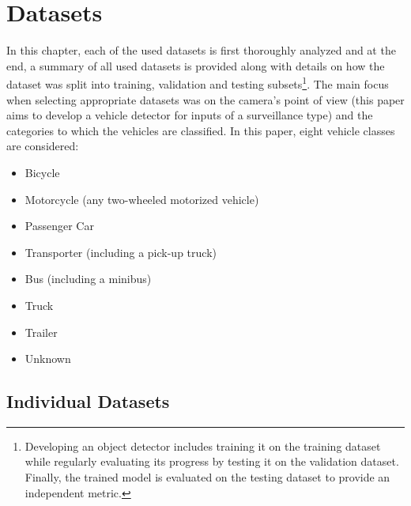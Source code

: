 



\chapter{Datasets}
\label{DatasetsChapter}


In this chapter, each of the used datasets is first thoroughly analyzed and at
the end, a summary of all used datasets is provided along with details on how
the dataset was split into training, validation and testing
subsets\footnote{Developing an object detector includes training it on the
training dataset while regularly evaluating its progress by testing it on the
validation dataset. Finally, the trained model is evaluated on the testing
dataset to provide an independent metric.}. The main focus when selecting
appropriate datasets was on the camera's point of view (this paper aims to
develop a vehicle detector for inputs of a surveillance type) and the categories
to which the vehicles are classified. In this paper, eight vehicle classes are
considered:
\begin{itemize}
    \item Bicycle
    \item Motorcycle (any two-wheeled motorized vehicle)
    \item Passenger Car
    \item Transporter (including a pick-up truck)
    \item Bus (including a minibus)
    \item Truck
    \item Trailer
    \item Unknown
\end{itemize}


\section{Individual Datasets}

